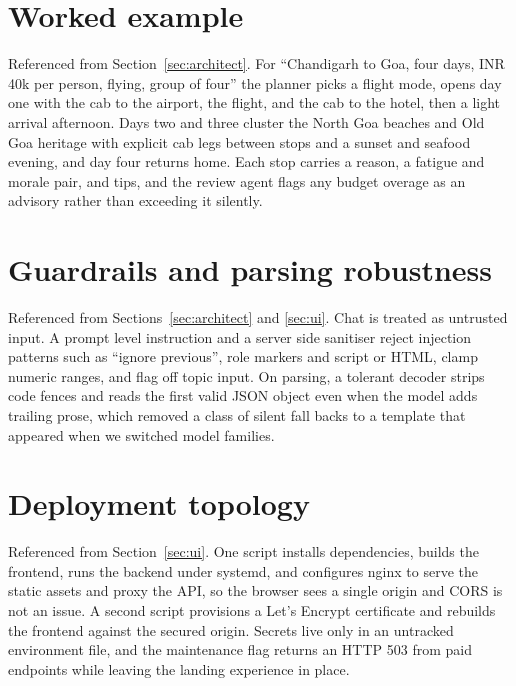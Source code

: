 \documentclass{ecai}
\newcommand{\rupee}{INR\,}
\begin{document}
\section{Worked example}
\label{app:example}
Referenced from Section~\ref{sec:architect}. For ``Chandigarh to Goa, four
days, \rupee40k per person, flying, group of four'' the planner picks a flight
mode, opens day one with the cab to the airport, the flight, and the cab to the
hotel, then a light arrival afternoon. Days two and three cluster the North Goa
beaches and Old Goa heritage with explicit cab legs between stops and a sunset
and seafood evening, and day four returns home. Each stop carries a reason, a
fatigue and morale pair, and tips, and the review agent flags any budget
overage as an advisory rather than exceeding it silently.

\section{Guardrails and parsing robustness}
\label{app:guard}
Referenced from Sections~\ref{sec:architect} and \ref{sec:ui}. Chat is treated
as untrusted input. A prompt level instruction and a server side sanitiser
reject injection patterns such as ``ignore previous'', role markers and script
or HTML, clamp numeric ranges, and flag off topic input. On parsing, a tolerant
decoder strips code fences and reads the first valid JSON object even when the
model adds trailing prose, which removed a class of silent fall backs to a
template that appeared when we switched model families.

\section{Deployment topology}
\label{app:deploy}
Referenced from Section~\ref{sec:ui}. One script installs dependencies, builds
the frontend, runs the backend under systemd, and configures nginx to serve the
static assets and proxy the API, so the browser sees a single origin and CORS
is not an issue. A second script provisions a Let's Encrypt certificate and
rebuilds the frontend against the secured origin. Secrets live only in an
untracked environment file, and the maintenance flag returns an HTTP 503 from
paid endpoints while leaving the landing experience in place.


\end{document}
